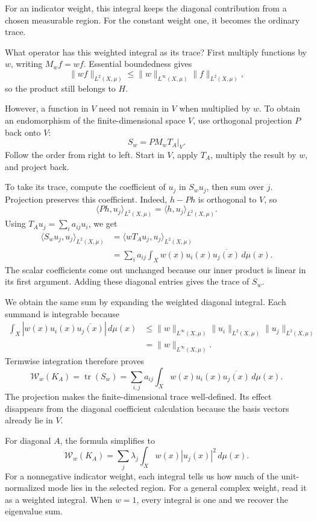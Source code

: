 For an indicator weight, this integral keeps the diagonal contribution from a chosen measurable region. For the constant weight one, it becomes the ordinary trace.

What operator has this weighted integral as its trace? First multiply functions by $w$, writing $M_wf=wf$. Essential boundedness gives
\[
\|wf\|_{L^2(X,\mu)}
\leq\|w\|_{L^\infty(X,\mu)}\|f\|_{L^2(X,\mu)},
\]
so the product still belongs to $H$.

However, a function in $V$ need not remain in $V$ when multiplied by $w$. To obtain an endomorphism of the finite-dimensional space $V$, use orthogonal projection $P$ back onto $V$:
\[
S_w=P M_wT_A|_V.
\]
Follow the order from right to left. Start in $V$, apply $T_A$, multiply the result by $w$, and project back.

To take its trace, compute the coefficient of $u_j$ in $S_wu_j$, then sum over $j$. Projection preserves this coefficient. Indeed, $h-Ph$ is orthogonal to $V$, so
\[
\langle Ph,u_j\rangle_{L^2(X,\mu)}
=\langle h,u_j\rangle_{L^2(X,\mu)}.
\]
Using $T_Au_j=\sum_i a_{ij}u_i$, we get
\[
\begin{aligned}
\langle S_wu_j,u_j\rangle_{L^2(X,\mu)}
&=\langle wT_Au_j,u_j\rangle_{L^2(X,\mu)}\\
&=\sum_i a_{ij}\int_Xw(x)u_i(x)\overline{u_j(x)}\,d\mu(x).
\end{aligned}
\]
The scalar coefficients come out unchanged because our inner product is linear in its first argument. Adding these diagonal entries gives the trace of $S_w$.

We obtain the same sum by expanding the weighted diagonal integral. Each summand is integrable because
\[
\begin{aligned}
\int_X|w(x)u_i(x)\overline{u_j(x)}|\,d\mu(x)
&\leq\|w\|_{L^\infty(X,\mu)}
\|u_i\|_{L^2(X,\mu)}\|u_j\|_{L^2(X,\mu)}\\
&=\|w\|_{L^\infty(X,\mu)}.
\end{aligned}
\]
Termwise integration therefore proves
\[
\mathcal W_w(K_A)=\operatorname{tr}(S_w)
=\sum_{i,j}a_{ij}\int_Xw(x)u_i(x)\overline{u_j(x)}\,d\mu(x).
\]
The projection makes the finite-dimensional trace well-defined. Its effect disappears from the diagonal coefficient calculation because the basis vectors already lie in $V$.

For diagonal $A$, the formula simplifies to
\[
\boxed{\mathcal W_w(K_A)
=\sum_j\lambda_j\int_Xw(x)|u_j(x)|^2\,d\mu(x).}
\]
For a nonnegative indicator weight, each integral tells us how much of the unit-normalized mode lies in the selected region. For a general complex weight, read it as a weighted integral. When $w=1$, every integral is one and we recover the eigenvalue sum.

